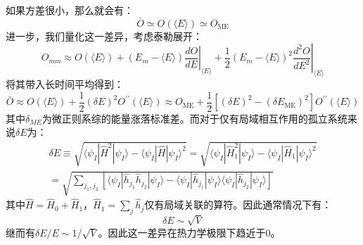 如果方差很小，那么就会有：
\begin{equation}
\bar{O} \simeq O(\langle E\rangle) \simeq O_{\mathrm{ME}}
\end{equation}
进一步，我们量化这一差异，考虑泰勒展开：
\begin{equation}
O_{m m} \approx O(\langle E\rangle)+\left.\left(E_{m}-\langle E\rangle\right) \frac{d O}{d E}\right|_{\langle E\rangle}+\left.\frac{1}{2}\left(E_{m}-\langle E\rangle\right)^{2} \frac{d^{2} O}{d E^{2}}\right|_{\langle E\rangle}
\end{equation}
将其带入长时间平均得到：
\begin{equation}
\bar{O} \approx O(\langle E\rangle)+\frac{1}{2}(\delta E)^{2} O^{\prime \prime}(\langle E\rangle) \approx O_{\mathrm{ME}}+\frac{1}{2}\left[(\delta E)^{2}-\left(\delta E_{\mathrm{ME}}\right)^{2}\right] O^{\prime \prime}(\langle E\rangle)
\end{equation}
其中$\delta_{ME}$为微正则系综的能量涨落标准差。而对于仅有局域相互作用的孤立系统来说$\delta E$为：
\begin{equation}
\begin{array}{r}
\delta E \equiv \sqrt{\langle\psi_{I}|\hat{H}^{2}| \psi_{I}\rangle-\langle\psi_{I}|\hat{H}| \psi_{I}\rangle^{2}}=\sqrt{\langle\psi_{I}|\hat{H}_{1}^{2}| \psi_{I}\rangle-\langle\psi_{I}|\hat{H}_{1}| \psi_{I}\rangle^{2}} \\
=\sqrt{\sum_{j_{1}, j_{2}}\left[\langle\psi_{I}|\hat{h}_{j_{1}} \hat{h}_{j_{2}}| \psi_{I}\rangle-\langle\psi_{I}|\hat{h}_{j_{1}}| \psi_{I}\rangle\langle\psi_{I}|\hat{h}_{j_{2}}| \psi_{I}\rangle\right]}
\end{array}
\end{equation}
其中$\hat{H}=\hat{H}_{0}+\hat{H}_{1}$，$\hat{H}_{1}=\sum_{j} \hat{h}_{j}$仅有局域关联的算符。因此通常情况下有：
\begin{equation}
\delta E \sim \sqrt{V}
\end{equation}
继而有$\delta E / E \sim 1 / \sqrt{V}$。因此这一差异在热力学极限下趋近于0。

